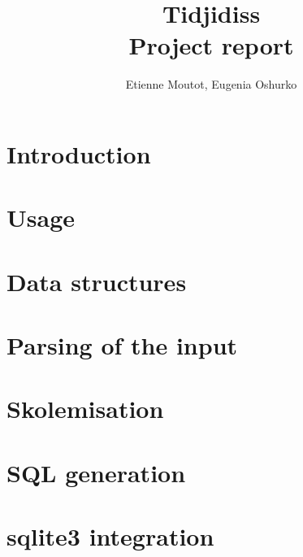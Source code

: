 \documentclass[a4paper,11pt]{article}
\title{{\Huge Tidjidiss}\\
Project report}
\author{Etienne Moutot, Eugenia Oshurko}
\begin{document}
\maketitle

\section{Introduction}
\section{Usage}
\section{Data structures}
\section{Parsing of the input}
\section{Skolemisation}
\section{SQL generation}
\section{sqlite3 integration}
\end{document}
